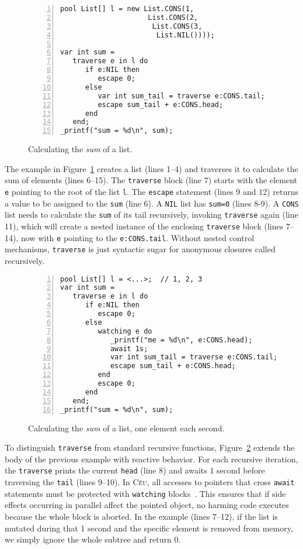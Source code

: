 \documentclass{acm_proc_article-sp}
\newcommand{\CEU}{\textsc{C\'{e}u}\xspace}
\newcommand{\code}[1] {{\small{\texttt{#1}}}}
\begin{document}
\begin{figure}%
\begin{lstlisting}[numbers=left,xleftmargin=3em]
pool List[] l = new List.CONS(1,
                     List.CONS(2,
                      List.CONS(3,
                       List.NIL())));

var int sum =
   traverse e in l do
      if e:NIL then
         escape 0;
      else
         var int sum_tail = traverse e:CONS.tail;
         escape sum_tail + e:CONS.head;
      end
   end;
_printf("sum = %d\n", sum);
\end{lstlisting}
\caption{
Calculating the \emph{sum} of a list.
\label{lst.sum}
}
\end{figure}

The example in Figure~\ref{lst.sum} creates a list (lines 1--4) and traverses 
it to calculate the sum of elements (lines 6--15).
The \code{traverse} block (line 7) starts with the element \code{e} pointing to 
the root of the list \code{l}.
The \code{escape} statement (lines 9 and 12) returns a value to be assigned to 
the \code{sum} (line 6).
A \code{NIL} list has \code{sum=0} (lines 8-9).
A \code{CONS} list needs to calculate the \code{sum} of its tail recursively, 
invoking \code{traverse} again (line 11), which will create a nested instance 
of the enclosing \code{traverse} block (lines 7--14), now with \code{e} 
pointing to the \code{e:CONS.tail}.
Without nested control mechanisms, \code{traverse} is just syntactic sugar for 
anonymous closures called recursively.

\begin{figure}%
\begin{lstlisting}[numbers=left,xleftmargin=3em]
pool List[] l = <...>;  // 1, 2, 3
var int sum =
   traverse e in l do
      if e:NIL then
         escape 0;
      else
         watching e do
            _printf("me = %d\n", e:CONS.head);
            await 1s;
            var int sum_tail = traverse e:CONS.tail;
            escape sum_tail + e:CONS.head;
         end
         escape 0;
      end
   end;
_printf("sum = %d\n", sum);
\end{lstlisting}
\caption{
Calculating the \emph{sum} of a list, one element each second.
\label{lst.sum.react}
}
\end{figure}

To distinguish \code{traverse} from standard recursive functions, 
Figure~\ref{lst.sum.react} extends the body of the previous example with 
reactive behavior.
For each recursive iteration, the \code{traverse} prints the current 
\code{head} (line 8) and awaits 1 second before traversing the \code{tail} 
(lines 9--10).
In \CEU, all accesses to pointers that cross \code{await} statements must be 
protected with \code{watching} blocks~\cite{ceu.mod15}.
This ensures that if side effects occurring in parallel affect the pointed 
object, no harming code executes because the whole block is aborted.
In the example (lines 7--12), if the list is mutated during that 1 second and 
the specific element is removed from memory, we simply ignore the whole subtree 
and return 0.
\end{document}

